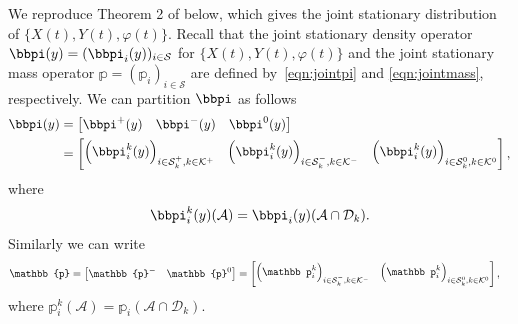 We reproduce Theorem 2 of \citep{bo2014} below, which gives the joint stationary distribution of $\{X(t), Y(t), \varphi(t)\}$. Recall that the joint stationary density operator ${\bbpi}(y) = (\bbpi_i(y))_{i \in \mathcal{S}}$ for $\{X(t), Y(t), \varphi(t)\}$ and the joint stationary mass operator ${\mathbb p} = (\mathbb p_i)_{i \in \mathcal{S}}$ are defined by~\eqref{eqn:jointpi} and \eqref{eqn:jointmass}, respectively. %
We can partition \(\bbpi\) as follows 
% 
	\begin{align*} 
		\bbpi(y) &= \vligne{\bbpi^{+}(y) & \bbpi^{-}(y) & \bbpi^{0}(y)} 
		\\&= \vligne{\left(\bbpi^{k}_i(y)\right)_{i \in \mathcal{S}_k^+,k\in\mathcal K^+} & \left(\bbpi^{k}_i(y)\right)_{i \in \mathcal{S}_k^-,k\in\mathcal K^-} & \left(\bbpi^{k}_i(y)\right)_{i \in \mathcal{S}_k^0,k\in\mathcal K^0}},
	\end{align*} 
	where  
% 
	\begin{align*} 
		\bbpi_i^{k}(y)(\mathcal{A}) = \bbpi_i(y)(\mathcal{A}\cap \mathcal D_k).
	\end{align*} 
%
Similarly we can write 
	\begin{align*} 
		\mathbb{p} &= \vligne{\mathbb{p}^{-} & \mathbb{p}^{0}} 
		= \vligne{\left(\mathbb p^{k}_i\right)_{i \in \mathcal{S}_k^-,k\in\mathcal K^-}  & \left(\mathbb p^{k}_i\right)_{i \in \mathcal{S}_k^0,k\in\mathcal K^0} },
	\end{align*} 
	where  
% 
	\( 
		\mathbb p_i^{k}(\mathcal{A}) = \mathbb p_i(\mathcal{A}\cap \mathcal D_k).
	\) 
%
